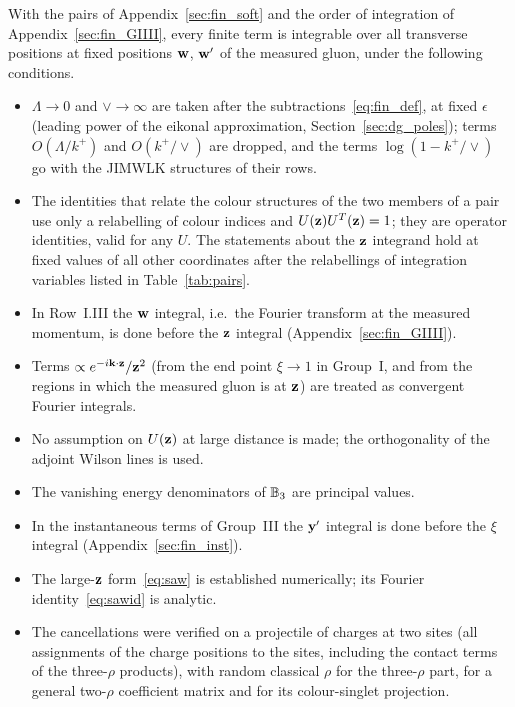 With the pairs of Appendix~\ref{sec:fin_soft} and the order of integration of Appendix~\ref{sec:fin_GIIII}, every finite term is integrable over all transverse positions at fixed positions $\mathbf{w}$, $\mathbf{w}'$ of the measured gluon, under the following conditions.
\begin{itemize}
\item[(C1)] $\Lambda\to0$ and $\vee\to\infty$ are taken after the subtractions~\eqref{eq:fin_def}, at fixed $\epsilon$ (leading power of the eikonal approximation, Section~\ref{sec:dg_poles}); terms $O(\Lambda/k^+)$ and $O(k^+/\vee)$ are dropped, and the terms $\log(1-k^+/\vee)$ go with the JIMWLK structures of their rows.
\item[(C2)] The identities that relate the colour structures of the two members of a pair use only a relabelling of colour indices and $U(\mathbf{z})U^T(\mathbf{z})=1$; they are operator identities, valid for any $U$. The statements about the $\mathbf{z}$ integrand hold at fixed values of all other coordinates after the relabellings of integration variables listed in Table~\ref{tab:pairs}.
\item[(C3)] In Row~I.III the $\mathbf{w}$ integral, i.e.\ the Fourier transform at the measured momentum, is done before the $\mathbf{z}$ integral (Appendix~\ref{sec:fin_GIIII}).
\item[(C4)] Terms $\propto e^{-i\mathbf{k}\cdot\mathbf{z}}/\mathbf{z}^2$ (from the end point $\xi\to1$ in Group~I, and from the regions in which the measured gluon is at $\mathbf{z}$) are treated as convergent Fourier integrals.
\item[(C5)] No assumption on $U(\mathbf{z})$ at large distance is made; the orthogonality of the adjoint Wilson lines is used.
\item[(C6)] The vanishing energy denominators of $\mathbb{B}_3$ are principal values.
\item[(C7)] In the instantaneous terms of Group~III the $\mathbf{y}'$ integral is done before the $\xi$ integral (Appendix~\ref{sec:fin_inst}).
\item[(C8)] The large-$\mathbf{z}$ form~\eqref{eq:saw} is established numerically; its Fourier identity~\eqref{eq:sawid} is analytic.
\item[(C9)] The cancellations were verified on a projectile of charges at two sites (all assignments of the charge positions to the sites, including the contact terms of the three-$\rho$ products), with random classical $\rho$ for the three-$\rho$ part, for a general two-$\rho$ coefficient matrix and for its colour-singlet projection.

\end{itemize}
